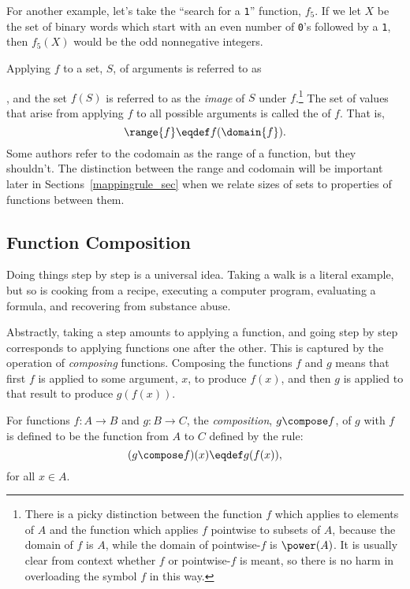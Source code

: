 For another example, let's take the ``search for a \texttt{1}''
function, $f_5$.  If we let $X$ be the set of binary words which
start with an even number of \texttt{0}'s followed by a
\texttt{1}, then $f_5(X)$ would be the odd nonnegative integers.

Applying $f$ to a set, $S$, of arguments is referred to as
, and the
set $f(S)$ is referred to as the \emph{image}%
of $S$ under $f$.\footnote{There is a picky distinction between the function $f$ which
  applies to elements of $A$ and the function which applies $f$ pointwise
  to subsets of $A$, because the domain of $f$ is $A$, while the domain of
  pointwise-$f$ is $\power(A)$.  It is usually clear from context whether
  $f$ or pointwise-$f$ is meant, so there is no harm in overloading the
  symbol $f$ in this way.}  The set of values that arise from applying $f$
to all possible arguments is called the  of $f$.  That is,
\[
\range{f} \eqdef f(\domain{f}).
\]
Some authors refer to the codomain as the range of a function, but
they shouldn't.  The distinction between the range and codomain will
be important later in Sections~\ref{mappingrule_sec} when we
relate sizes of sets to properties of functions between them.

\subsection{Function Composition}\label{func_compose_subsec}

Doing things step by step is a universal idea.  Taking a walk is a literal
example, but so is cooking from a recipe, executing a computer program,
evaluating a formula, and recovering from substance abuse.

Abstractly, taking a step amounts to applying a function, and going step
by step corresponds to applying functions one after the other.  This is
captured by the operation of \emph{composing}%
functions.  Composing the
functions $f$ and $g$ means that first $f$ is applied to some argument,
$x$, to produce $f(x)$, and then $g$ is applied to that result to produce
$g(f(x))$.

\begin{definition}\label{func_compose_def}
  For functions $f:A \to B$ and $g:B \to C$, the \emph{composition},
  $g \compose f$, of $g$ with $f$ is defined to be the function
  from $A$ to $C$ defined by the rule:
\begin{displaymath}
(g \compose f)(x) \eqdef g(f(x)),
\end{displaymath}
for all $x \in A$.
\end{definition}

